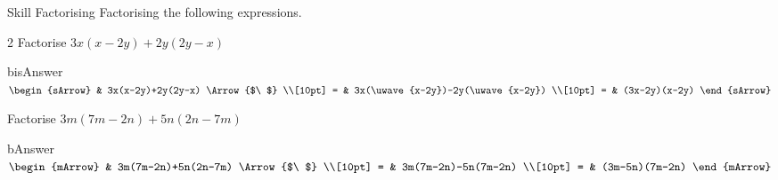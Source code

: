 \clearpage\noindent%
\begin{boxSkill}{Skill   \thenskill \quad Factorising}
  Factorising the following expressions.
  \begin{mtask}{2} 
    \task Factorise $3x(x-2y)+2y(2y-x)$
              \begin{envOut}[equal height group=A-Rev-1]{bisAnswer}
			       $\begin{sArrow}
			             & 3x(x-2y)+2y(2y-x)                 \Arrow{$\ $} \\[10pt]
                       = & 3x(\uwave{x-2y})-2y(\uwave{x-2y})              \\[10pt] 
                       = & (3x-2y)(x-2y)  					   
	                \end{sArrow}$
              \end{envOut}
    \task Factorise $3m(7m-2n)+5n(2n-7m)$
              \begin{envOut}[equal height group=A-Rev-1]{bAnswer}
			       $\begin{mArrow}
			             & 3m(7m-2n)+5n(2n-7m)    \Arrow{$\ $} \\[10pt]
                       = & 3m(7m-2n)-5n(7m-2n)    \\[10pt]
                       = & (3m-5n)(7m-2n) 					   
	                \end{mArrow}$
              \end{envOut}
   \end{mtask}
\end{boxSkill}

